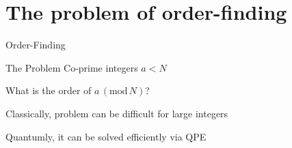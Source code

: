 \documentclass{beamer}
\begin{document}
\section{The problem of order-finding}

\begin{frame}{Order-Finding}
        \begin{block}{The Problem}
                Co-prime integers $a < N$ 

                What is the order of $a \, (\mathrm{mod} \, N)$?
        \end{block}

        \pause
        Classically, problem can be difficult for large integers

        Quantumly, it can be solved efficiently via QPE
\end{frame}
\end{document}
